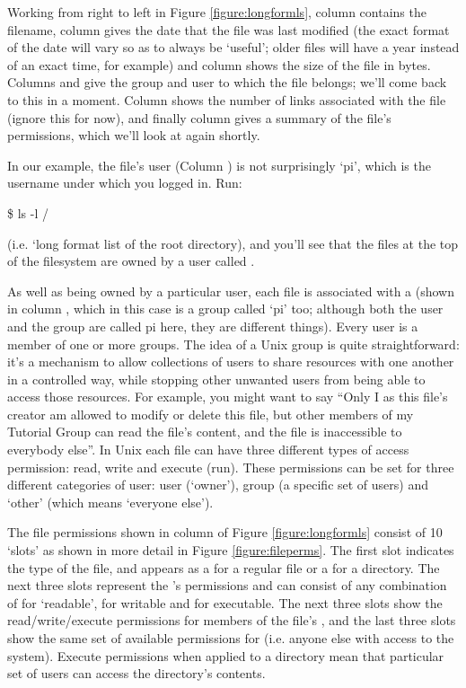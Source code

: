 Working from right to left in Figure \ref{figure:longformls}, column \protect{} contains the filename, column \protect{} gives the date that the file was last modified (the exact format of the date will vary so as to always be `useful'; older files will have a year instead of an exact time, for example) and column \protect{} shows the size of the file in bytes. Columns \protect{} and \protect{} give the group and user to which the file belongs; we'll come back to this in a moment. Column \protect{} shows the number of links associated with the file (ignore this for now), and finally column \protect{} gives a summary of the file's permissions, which we'll look at again shortly.

In our example, the file's user (Column \protect{}) is not surprisingly `pi', which is the username under which you logged in. Run:

\begin{ttoutenv}
\$ ls -l /
\end{ttoutenv}

(i.e. `long format list of the root directory), and you'll see that the files at the top of the filesystem are owned by a user called .

As well as being owned by a particular user, each file is associated with a  (shown in column \protect{}, which in this case is a group called `pi' too; although both the user and the group are called pi here, they are different things). Every user is a member of one or more groups. The idea of a Unix group is quite straightforward: it's a mechanism to allow collections of users to share resources with one another in a controlled way, while stopping other unwanted users from being able to access those resources. For example, you might want to say ``Only I as this file's creator am allowed to modify or delete this file, but other members of my Tutorial Group can read the file's content, and the file is inaccessible to everybody else''. In Unix each file can have three different types of access permission: read, write and execute (run). These permissions can be set for three different categories of user: user (`owner'), group (a specific set of users) and `other' (which means `everyone else').

The file permissions shown in column \protect{} of Figure \ref{figure:longformls} consist of 10 `slots' as shown in more detail in Figure \ref{figure:fileperms}. The first slot indicates the type of the file, and appears as a \ttout{-} for a regular file or a  for a directory. The next three slots represent the 's  permissions and can consist of any combination of  for `readable',  for writable and  for executable. The next three slots show the read/write/execute permissions for members of the file's , and the last three slots show the same set of available permissions for  (i.e. anyone else with access to the system). Execute permissions when applied to a directory mean that particular set of users can access the directory's contents.

